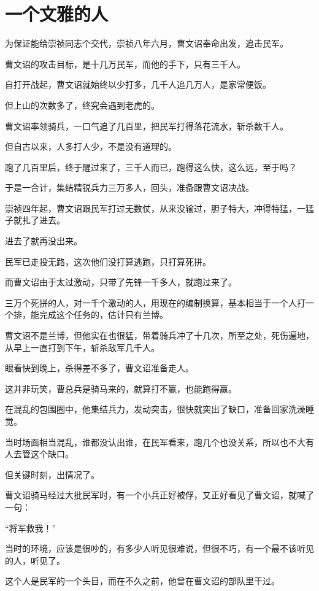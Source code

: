 \section{一个文雅的人}
\ifnum{}
	\begin{multicols}{\theparacolNo}
		\fi
		为保证能给崇祯同志个交代，崇祯八年六月，曹文诏奉命出发，追击民军。

		曹文诏的攻击目标，是十几万民军，而他的手下，只有三千人。

		自打开战起，曹文诏就始终以少打多，几千人追几万人，是家常便饭。

		但上山的次数多了，终究会遇到老虎的。

		曹文诏率领骑兵，一口气追了几百里，把民军打得落花流水，斩杀数千人。

		但自古以来，人多打人少，不是没有道理的。

		跑了几百里后，终于醒过来了，三千人而已，跑得这么快，这么远，至于吗？

		于是一合计，集结精锐兵力三万多人，回头，准备跟曹文诏决战。

		崇祯四年起，曹文诏跟民军打过无数仗，从来没输过，胆子特大，冲得特猛，一猛子就扎了进去。

		进去了就再没出来。

		民军已走投无路，这次他们没打算逃跑，只打算死拼。

		而曹文诏由于太过激动，只带了先锋一千多人，就跑过来了。

		三万个死拼的人，对一千个激动的人，用现在的编制换算，基本相当于一个人打一个排，能完成这个任务的，估计只有兰博。

		曹文诏不是兰博，但他实在也很猛，带着骑兵冲了十几次，所至之处，死伤遍地，从早上一直打到下午，斩杀敌军几千人。

		眼看快到晚上，杀得差不多了，曹文诏准备走人。

		这并非玩笑，曹总兵是骑马来的，就算打不赢，也能跑得赢。

		在混乱的包围圈中，他集结兵力，发动突击，很快就突出了缺口，准备回家洗澡睡觉。

		当时场面相当混乱，谁都没认出谁，在民军看来，跑几个也没关系，所以也不大有人去管这个缺口。

		但关键时刻，出情况了。

		曹文诏骑马经过大批民军时，有一个小兵正好被俘，又正好看见了曹文诏，就喊了一句：

		“将军救我！”

		当时的环境，应该是很吵的，有多少人听见很难说，但很不巧，有一个最不该听见的人，听见了。

		这个人是民军的一个头目，而在不久之前，他曾在曹文诏的部队里干过。


\end{multicols}
